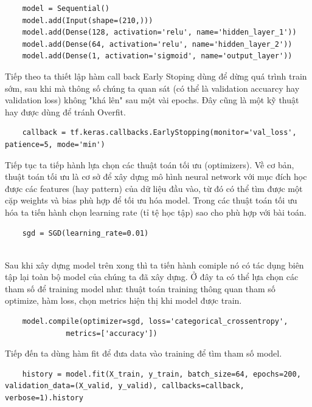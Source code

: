 \documentclass{article}
\begin{document}
\begin{verbatim}
	model = Sequential()
	model.add(Input(shape=(210,)))
	model.add(Dense(128, activation='relu', name='hidden_layer_1'))
	model.add(Dense(64, activation='relu', name='hidden_layer_2'))
	model.add(Dense(1, activation='sigmoid', name='output_layer'))
\end{verbatim}

Tiếp theo ta thiết lập hàm call back Early Stoping dùng để dừng quá trình train sớm, sau khi mà thông số chúng ta quan sát (có thể là validation accuarcy hay validation loss) không "khá lên" sau một vài epochs. Đây cũng là một kỹ thuật hay được dùng để tránh Overfit.

\begin{verbatim}
	callback = tf.keras.callbacks.EarlyStopping(monitor='val_loss', patience=5, mode='min')
\end{verbatim}

Tiếp tục ta tiếp hành lựa chọn các thuật toán tối ưu (optimizers). Về cơ bản, thuật toán tối ưu là cơ sở để xây dựng mô hình neural network với mục đích học được các features (hay pattern) của dữ liệu đầu vào, từ đó có thể tìm được một cặp weights và bias phù hợp để tối ưu hóa model. Trong các thuật toán tối ưu hóa ta tiến hành chọn learning rate (tỉ tệ học tập) sao cho phù hợp với bài toán.

\begin{verbatim}
	sgd = SGD(learning_rate=0.01)
	
\end{verbatim}

Sau khi xây dựng model trên xong thì ta tiến hành comiple nó có tác dụng biên tập lại toàn bộ model của chúng ta đã xây dựng. Ở đây ta có thể lựa chọn các tham số để training model như: thuật toán training thông quan tham số optimize, hàm loss, chọn metrics hiện thị khi model được train.

\begin{verbatim}
	model.compile(optimizer=sgd, loss='categorical_crossentropy',
              metrics=['accuracy'])
\end{verbatim}

Tiếp đến ta dùng hàm fit để đưa data vào training để tìm tham số model.

\begin{verbatim}
	history = model.fit(X_train, y_train, batch_size=64, epochs=200, validation_data=(X_valid, y_valid), callbacks=callback, verbose=1).history
\end{verbatim}
\end{document}
